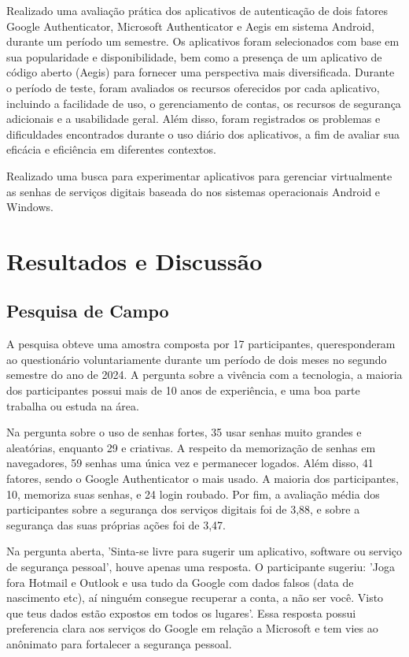 \documentclass[12pt]{article}
\begin{document}
Realizado uma avaliação prática dos aplicativos de autenticação de dois
fatores Google Authenticator, Microsoft Authenticator e Aegis em sistema
Android, durante um período um semestre. Os aplicativos foram selecionados
com base em sua popularidade e disponibilidade, bem como a presença de um
aplicativo de código aberto (Aegis) para fornecer uma perspectiva mais
diversificada.
Durante o período de teste, foram avaliados os recursos oferecidos por cada
aplicativo, incluindo a facilidade de uso, o gerenciamento de contas, os
recursos de segurança adicionais e a usabilidade geral.
Além disso, foram registrados os problemas e dificuldades encontrados
durante o uso diário dos aplicativos, a fim de avaliar sua eficácia e
eficiência em diferentes contextos.

Realizado uma busca para experimentar aplicativos para gerenciar
virtualmente as senhas de serviços digitais baseada do nos sistemas
operacionais Android e Windows.

\section{Resultados e Discussão}

\subsection{Pesquisa de Campo}

A pesquisa obteve uma amostra composta por 17 participantes, queresponderam
ao questionário voluntariamente durante um período de dois meses no segundo
semestre do ano de 2024.
A pergunta sobre a vivência com a tecnologia, a maioria dos
participantes possui mais de 10 anos de experiência, e uma boa parte
trabalha ou estuda na área.

Na pergunta sobre o uso de senhas fortes, 35%
usar senhas muito grandes e aleatórias, enquanto 29%
e criativas.
A respeito da memorização de senhas em navegadores, 59%
senhas uma única vez e permanecer logados.
Além disso, 41%
fatores, sendo o Google Authenticator o mais usado.
A maioria dos participantes, 10, memoriza suas senhas, e 24%
login roubado.
Por fim, a avaliação média dos participantes sobre a segurança dos serviços
digitais foi de 3,88, e sobre a segurança das suas próprias ações foi de
3,47.

Na pergunta aberta, 'Sinta-se livre para sugerir um aplicativo, software ou
serviço de segurança pessoal', houve apenas uma resposta.
O participante sugeriu: 'Joga fora Hotmail e Outlook e usa tudo da Google com
dados falsos (data de nascimento etc), aí ninguém consegue recuperar a conta,
a não ser você.
Visto que teus dados estão expostos em todos os lugares'.
Essa resposta possui preferencia clara aos serviços do Google em relação a
Microsoft e tem vies ao anônimato para fortalecer a segurança pessoal.
\end{document}
